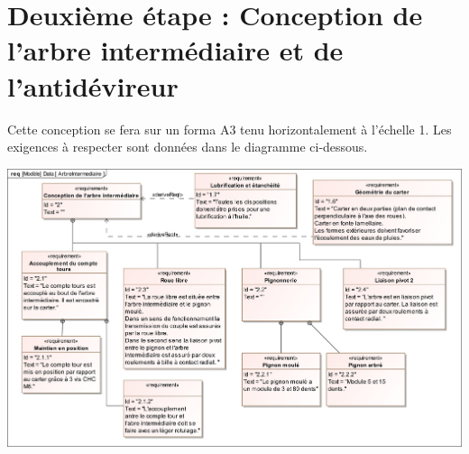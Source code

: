 \documentclass[10pt]{article}
\begin{document}
\section{Deuxième étape : Conception de l'arbre intermédiaire et de l'antidévireur}

Cette conception se fera sur un forma A3 tenu horizontalement à l'échelle 1. Les exigences à respecter sont données dans le diagramme ci-dessous.

\begin{center}
\includegraphics[width=\textwidth]{images/SysML/ArbreIntermediaire}
\end{center}

\end{document}
